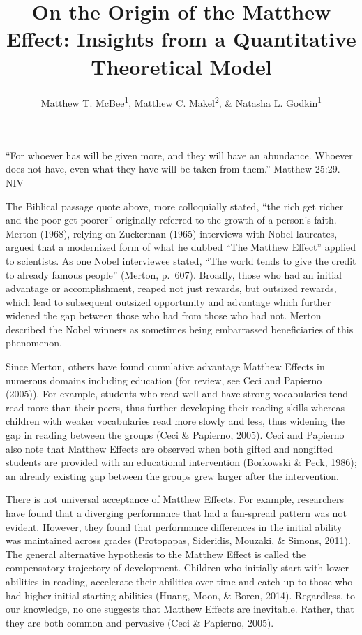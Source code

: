 \documentclass[english,floatsintext,jou]{apa6}
\title{On the Origin of the Matthew Effect: Insights from a Quantitative
Theoretical Model}
\author{Matthew T. McBee\textsuperscript{1}, Matthew C. Makel\textsuperscript{2}, \& Natasha L. Godkin\textsuperscript{1}}
\affiliation{
    \vspace{0.5cm}
          \textsuperscript{1} East Tennessee State University\\
          \textsuperscript{2} Duke University Talent Identification Program  }
\theoremstyle{definition}
\theoremstyle{definition}
\theoremstyle{definition}
\theoremstyle{remark}
\begin{document}
\maketitle

\setcounter{secnumdepth}{0}



\enquote{For whoever has will be given more, and they will have an
abundance. Whoever does not have, even what they have will be taken from
them.} Matthew 25:29. NIV

The Biblical passage quote above, more colloquially stated, \enquote{the
rich get richer and the poor get poorer} originally referred to the
growth of a person's faith. Merton (1968), relying on Zuckerman (1965)
interviews with Nobel laureates, argued that a modernized form of what
he dubbed \enquote{The Matthew Effect} applied to scientists. As one
Nobel interviewee stated, \enquote{The world tends to give the credit to
already famous people} (Merton, p.~607). Broadly, those who had an
initial advantage or accomplishment, reaped not just rewards, but
outsized rewards, which lead to subsequent outsized opportunity and
advantage which further widened the gap between those who had from those
who had not. Merton described the Nobel winners as sometimes being
embarrassed beneficiaries of this phenomenon.

Since Merton, others have found cumulative advantage Matthew Effects in
numerous domains including education (for review, see Ceci and Papierno
(2005)). For example, students who read well and have strong
vocabularies tend read more than their peers, thus further developing
their reading skills whereas children with weaker vocabularies read more
slowly and less, thus widening the gap in reading between the groups
(Ceci \& Papierno, 2005). Ceci and Papierno also note that Matthew
Effects are observed when both gifted and nongifted students are
provided with an educational intervention (Borkowski \& Peck, 1986); an
already existing gap between the groups grew larger after the
intervention.

There is not universal acceptance of Matthew Effects. For example,
researchers have found that a diverging performance that had a
fan-spread pattern was not evident. However, they found that performance
differences in the initial ability was maintained across grades
(Protopapas, Sideridis, Mouzaki, \& Simons, 2011). The general
alternative hypothesis to the Matthew Effect is called the compensatory
trajectory of development. Children who initially start with lower
abilities in reading, accelerate their abilities over time and catch up
to those who had higher initial starting abilities (Huang, Moon, \&
Boren, 2014). Regardless, to our knowledge, no one suggests that Matthew
Effects are inevitable. Rather, that they are both common and pervasive
(Ceci \& Papierno, 2005).
\end{document}
